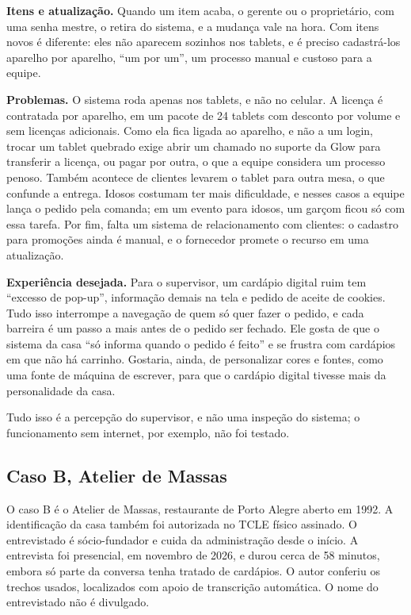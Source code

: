 \textbf{Itens e atualização.} Quando um item acaba, o gerente ou o proprietário, com uma senha mestre, o retira do sistema, e a mudança vale na hora. Com itens novos é diferente: eles não aparecem sozinhos nos tablets, e é preciso cadastrá-los aparelho por aparelho, ``um por um'', um processo manual e custoso para a equipe.

\textbf{Problemas.} O sistema roda apenas nos tablets, e não no celular. A licença é contratada por aparelho, em um pacote de 24 tablets com desconto por volume e sem licenças adicionais. Como ela fica ligada ao aparelho, e não a um login, trocar um tablet quebrado exige abrir um chamado no suporte da Glow para transferir a licença, ou pagar por outra, o que a equipe considera um processo penoso. Também acontece de clientes levarem o tablet para outra mesa, o que confunde a entrega. Idosos costumam ter mais dificuldade, e nesses casos a equipe lança o pedido pela comanda; em um evento para idosos, um garçom ficou só com essa tarefa. Por fim, falta um sistema de relacionamento com clientes: o cadastro para promoções ainda é manual, e o fornecedor promete o recurso em uma atualização.

\textbf{Experiência desejada.} Para o supervisor, um cardápio digital ruim tem ``excesso de pop-up'', informação demais na tela e pedido de aceite de cookies. Tudo isso interrompe a navegação de quem só quer fazer o pedido, e cada barreira é um passo a mais antes de o pedido ser fechado. Ele gosta de que o sistema da casa ``só informa quando o pedido é feito'' e se frustra com cardápios em que não há carrinho. Gostaria, ainda, de personalizar cores e fontes, como uma fonte de máquina de escrever, para que o cardápio digital tivesse mais da personalidade da casa.

Tudo isso é a percepção do supervisor, e não uma inspeção do sistema; o funcionamento sem internet, por exemplo, não foi testado.


\subsection{Caso B, Atelier de Massas}
\label{sec:res-caso-b}

O caso B é o Atelier de Massas, restaurante de Porto Alegre aberto em 1992. A identificação da casa também foi autorizada no TCLE físico assinado. O entrevistado é sócio-fundador e cuida da administração desde o início. A entrevista foi presencial, em novembro de 2026, e durou cerca de 58 minutos, embora só parte da conversa tenha tratado de cardápios. O autor conferiu os trechos usados, localizados com apoio de transcrição automática. O nome do entrevistado não é divulgado.

